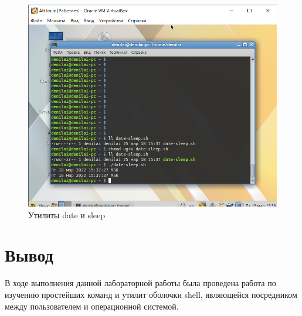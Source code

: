\documentclass[a4paper,14pt]{extarticle}
\begin{document}
\begin{figure}[h!]
	\centering
	\includegraphics[width=0.7\linewidth]{"images/Практика МИРЭА/Alt linux [Работает] - Oracle VM VirtualBox 18.03.2022 15_38_09"}
	\caption{Утилиты date и sleep}
	\label{fig:date-sleep}
\end{figure}
\clearpage
\section*{Вывод}
В ходе выполнения данной лабораторной работы была проведена работа по изучению простейших команд и утилит оболочки shell, являющейся посредником между пользователем и операционной системой.
\end{document}

